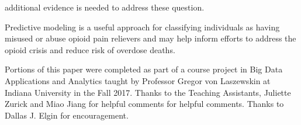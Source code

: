 \documentclass[sigconf]{acmart}
\begin{document}
additional evidence is needed to address these question. 

Predictive modeling is a useful approach for classifying individuals as 
having misused or abuse opioid pain relievers and may help inform 
efforts to address the opioid crisis and reduce risk of overdose deaths. 


\begin{acks}

Portions of this paper were completed as part of a course project in Big Data 
Applications and Analytics taught by Professor Gregor von Laszewskin at 
Indiana University in the Fall 2017. Thanks to the Teaching Assistants, 
Juliette Zurick and Miao Jiang for helpful comments for helpful comments. 
Thanks to Dallas J. Elgin for encouragement. 

\end{acks}

 

%
\end{document}
